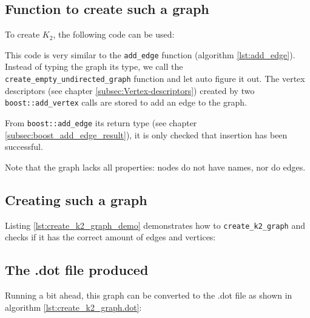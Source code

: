 \subsection{Function to create such a graph}

To create $K_{2}$, the following code can be used:



This code is very similar to 
the \verb;add_edge; function (algorithm \ref{lst:add_edge}).
Instead of typing the graph its type, 
we call the \verb;create_empty_undirected_graph; 
function and let auto figure it out.
The vertex descriptors 
(see chapter \ref{subsec:Vertex-descriptors}) 
created by two \verb;boost::add_vertex; 
calls are stored to add an edge to the graph.

From \verb;boost::add_edge; 
its return type 
(see chapter \ref{subsec:boost_add_edge_result}), 
it is only checked that insertion has been successful.

Note that the graph lacks all properties: nodes do not have names, nor do
edges.

\subsection{Creating such a graph}

Listing \ref{lst:create_k2_graph_demo}
demonstrates how to \verb;create_k2_graph; and checks if it has the correct
amount of edges and vertices:



\subsection{The .dot file produced}
\label{subsec:create_k2_dot}

Running a bit ahead, this graph can be converted to the .dot file as shown
in algorithm \ref{lst:create_k2_graph.dot}:



